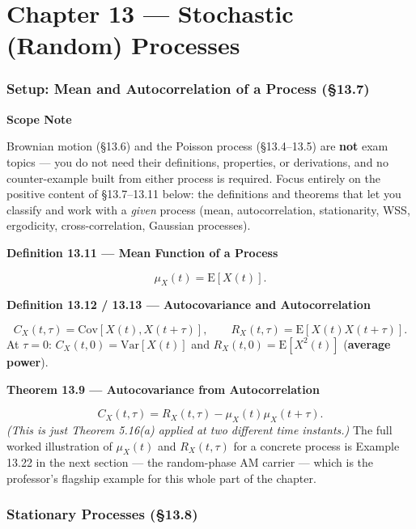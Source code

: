 \documentclass[11pt]{article}
\newcommand{\E}[1]{\mathrm{E}\left[#1\right]}
\newcommand{\Var}[1]{\mathrm{Var}\left[#1\right]}
\newcommand{\Cov}[1]{\mathrm{Cov}\left[#1\right]}
\newcommand{\topline}[1]{\par\vspace{5pt}\noindent{\color{#1}\rule{\linewidth}{1.1pt}}\par\vspace{3pt}}
\newcommand{\botline}[1]{\par\vspace{2pt}\noindent{\color{#1}\rule{\linewidth}{1.1pt}}\par\vspace{8pt}}
\newenvironment{defbox}[2]{%
  \topline{defcol}\noindent\textbf{\color{defcol}Definition #1 --- #2}\par\smallskip\noindent\ignorespaces
}{\botline{defcol}}
\newenvironment{thmbox}[2]{%
  \topline{thmcol}\noindent\textbf{\color{thmcol}Theorem #1 --- #2}\par\smallskip\noindent\ignorespaces
}{\botline{thmcol}}
\newenvironment{notebox}[1]{%
  \topline{notecol}\noindent\textbf{\color{notecol}#1}\par\smallskip\noindent\ignorespaces
}{\botline{notecol}}
\begin{document}
\clearpage
\part{Chapter 13 --- Stochastic (Random) Processes}
\section{Setup: Mean and Autocorrelation of a Process (\S13.7)}

\begin{notebox}{Scope Note}
Brownian motion (\S13.6) and the Poisson process (\S13.4--13.5) are \textbf{not} exam topics
--- you do not need their definitions, properties, or derivations, and no counter-example
built from either process is required. Focus entirely on the positive content of
\S13.7--13.11 below: the definitions and theorems that let you classify and work with a
\emph{given} process (mean, autocorrelation, stationarity, WSS, ergodicity, cross-correlation,
Gaussian processes).
\end{notebox}

\begin{defbox}{13.11}{Mean Function of a Process}
\[ \mu_X(t) = \E{X(t)}. \]
\end{defbox}

\begin{defbox}{13.12 / 13.13}{Autocovariance and Autocorrelation}
\[ C_X(t,\tau) = \Cov{X(t),X(t+\tau)}, \qquad R_X(t,\tau) = \E{X(t)X(t+\tau)}. \]
At $\tau=0$: $C_X(t,0)=\Var{X(t)}$ and $R_X(t,0)=\E{X^2(t)}$ (\textbf{average power}).
\end{defbox}

\begin{thmbox}{13.9}{Autocovariance from Autocorrelation}
\[ C_X(t,\tau) = R_X(t,\tau) - \mu_X(t)\mu_X(t+\tau). \]
\emph{(This is just Theorem 5.16(a) applied at two different time instants.)} The full worked
illustration of $\mu_X(t)$ and $R_X(t,\tau)$ for a concrete process is Example 13.22 in the
next section --- the random-phase AM carrier --- which is the professor's flagship example for
this whole part of the chapter.
\end{thmbox}

\clearpage
\section{Stationary Processes (\S13.8)}
\label{sec:138}
\end{document}
